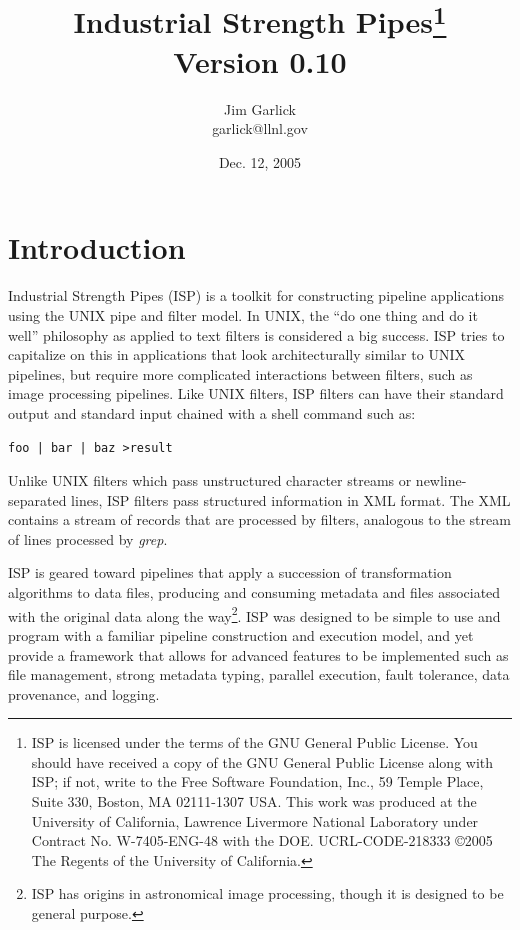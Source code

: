 \documentclass{article}
\begin{document}
\title{Industrial Strength Pipes\footnote{
	ISP is licensed under the terms of the GNU General Public License.  
	You should have received a copy of the GNU General Public License 
	along with ISP; if not, write to the Free Software Foundation, Inc.,
	59 Temple Place, Suite 330, Boston, MA  02111-1307  USA.
	This work was produced at the University of California, 
	Lawrence Livermore National Laboratory under Contract 
	No. W-7405-ENG-48 with the DOE.  
	UCRL-CODE-218333
	\copyright 2005 The Regents of the University of California.
	}\\
	Version 0.10}
\author{Jim Garlick\\ garlick@llnl.gov}

\date{Dec. 12, 2005}

\maketitle

\section{Introduction}

Industrial Strength Pipes (ISP) is a toolkit for constructing pipeline
applications using the UNIX pipe and filter model.  
In UNIX, the ``do one thing and do it well'' philosophy as applied to 
text filters is considered a big success.  ISP tries to capitalize on this
in applications that look architecturally similar to UNIX pipelines, but
require more complicated interactions between filters, such as image processing
pipelines.  Like UNIX filters, 
ISP filters can have their standard output and standard input chained
with a shell command such as:
\begin{verbatim}
foo | bar | baz >result
\end{verbatim}
Unlike UNIX filters which pass unstructured character streams or 
newline-separated lines, ISP filters pass structured information in XML 
format.  The XML contains a stream of records that are processed by
filters, analogous to the stream of lines processed by {\em grep}.

ISP is geared toward pipelines that apply a succession
of transformation algorithms to data files, producing and consuming 
metadata and files associated with the original data along the 
way\footnote{ISP has origins in astronomical image processing, though
it is designed to be general purpose.}.
ISP was designed to be simple to use and program with a familiar pipeline
construction and execution model, and yet provide a framework that allows
for advanced features to be implemented such as file management, 
strong metadata typing, parallel execution, fault tolerance, data 
provenance, and logging.
\end{document}
